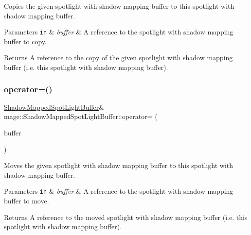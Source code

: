 Copies the given spotlight with shadow mapping buffer to this spotlight with shadow mapping buffer.


\begin{DoxyParams}[1]{Parameters}
\mbox{\tt in}  & {\em buffer} & A reference to the spotlight with shadow mapping buffer to copy. \\
\hline
\end{DoxyParams}
\begin{DoxyReturn}{Returns}
A reference to the copy of the given spotlight with shadow mapping buffer (i.\+e. this spotlight with shadow mapping buffer). 
\end{DoxyReturn}
\hypertarget{structmage_1_1_shadow_mapped_spot_light_buffer_a2548124593b08822df6b3d7ded13b32e}{}\label{structmage_1_1_shadow_mapped_spot_light_buffer_a2548124593b08822df6b3d7ded13b32e} 
\subsubsection{\texorpdfstring{operator=()}{operator=()}\hspace{0.1cm}{\footnotesize\ttfamily [2/2]}}
{\footnotesize\ttfamily \hyperlink{structmage_1_1_shadow_mapped_spot_light_buffer}{Shadow\+Mapped\+Spot\+Light\+Buffer}\& mage\+::\+Shadow\+Mapped\+Spot\+Light\+Buffer\+::operator= (\begin{DoxyParamCaption}\item[{\hyperlink{structmage_1_1_shadow_mapped_spot_light_buffer}{Shadow\+Mapped\+Spot\+Light\+Buffer} \&\&}]{buffer }\end{DoxyParamCaption})\hspace{0.3cm}{\ttfamily [default]}}

Moves the given spotlight with shadow mapping buffer to this spotlight with shadow mapping buffer.


\begin{DoxyParams}[1]{Parameters}
\mbox{\tt in}  & {\em buffer} & A reference to the spotlight with shadow mapping buffer to move. \\
\hline
\end{DoxyParams}
\begin{DoxyReturn}{Returns}
A reference to the moved spotlight with shadow mapping buffer (i.\+e. this spotlight with shadow mapping buffer). 
\end{DoxyReturn}


